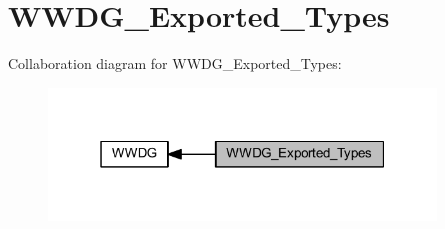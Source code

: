 \hypertarget{group___w_w_d_g___exported___types}{}\section{W\+W\+D\+G\+\_\+\+Exported\+\_\+\+Types}
\label{group___w_w_d_g___exported___types}
Collaboration diagram for W\+W\+D\+G\+\_\+\+Exported\+\_\+\+Types\+:
\nopagebreak
\begin{figure}[H]
\begin{center}
\leavevmode
\includegraphics[width=292pt]{group___w_w_d_g___exported___types}
\end{center}
\end{figure}
